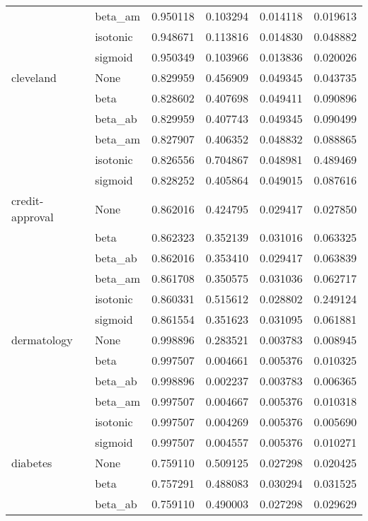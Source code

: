 \begin{tabular}{llrrrr}
        & beta\_am &  0.950118 &  0.103294 &  0.014118 &  0.019613 \\
        & isotonic &  0.948671 &  0.113816 &  0.014830 &  0.048882 \\
        & sigmoid &  0.950349 &  0.103966 &  0.013836 &  0.020026 \\
cleveland & None &  0.829959 &  0.456909 &  0.049345 &  0.043735 \\
        & beta &  0.828602 &  0.407698 &  0.049411 &  0.090896 \\
        & beta\_ab &  0.829959 &  0.407743 &  0.049345 &  0.090499 \\
        & beta\_am &  0.827907 &  0.406352 &  0.048832 &  0.088865 \\
        & isotonic &  0.826556 &  0.704867 &  0.048981 &  0.489469 \\
        & sigmoid &  0.828252 &  0.405864 &  0.049015 &  0.087616 \\
credit-approval & None &  0.862016 &  0.424795 &  0.029417 &  0.027850 \\
        & beta &  0.862323 &  0.352139 &  0.031016 &  0.063325 \\
        & beta\_ab &  0.862016 &  0.353410 &  0.029417 &  0.063839 \\
        & beta\_am &  0.861708 &  0.350575 &  0.031036 &  0.062717 \\
        & isotonic &  0.860331 &  0.515612 &  0.028802 &  0.249124 \\
        & sigmoid &  0.861554 &  0.351623 &  0.031095 &  0.061881 \\
dermatology & None &  0.998896 &  0.283521 &  0.003783 &  0.008945 \\
        & beta &  0.997507 &  0.004661 &  0.005376 &  0.010325 \\
        & beta\_ab &  0.998896 &  0.002237 &  0.003783 &  0.006365 \\
        & beta\_am &  0.997507 &  0.004667 &  0.005376 &  0.010318 \\
        & isotonic &  0.997507 &  0.004269 &  0.005376 &  0.005690 \\
        & sigmoid &  0.997507 &  0.004557 &  0.005376 &  0.010271 \\
diabetes & None &  0.759110 &  0.509125 &  0.027298 &  0.020425 \\
        & beta &  0.757291 &  0.488083 &  0.030294 &  0.031525 \\
        & beta\_ab &  0.759110 &  0.490003 &  0.027298 &  0.029629 \\

\end{tabular}
